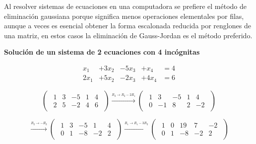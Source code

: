 \documentclass{article}
\begin{document}
Al resolver sistemas de ecuaciones en una computadora se prefiere el método de eliminación gaussiana porque significa menos operaciones elementales por filas, aunque a veces es esencial obtener la forma escalonada reducida por renglones de una matriz, en estos casos la eliminación de Gauss-Jordan es el método preferido.

\begin{large}
    \textbf{Solución de un sistema de 2 ecuaciones con 4 incógnitas}
\end{large}

\begin{equation*}
    \begin{aligned}
    x_1 &+ 3x_2 &- 5x_3 &+ x_4 &= 4 \\
    2x_1 &+ 5x_2 &- 2x_3 &+ 4x_4 &= 6    
    \end{aligned}
\end{equation*}

\begin{equation*}
    \begin{pmatrix}
        \begin{array}{rrrr|r}
            1 & 3 & -5 & 1 & 4\\
            2 & 5 & -2 & 4 & 6
        \end{array}
    \end{pmatrix}
\xrightarrow{\stackrel{R_2 \rightarrow R_2 - 2R_1}{}}
    \begin{pmatrix}
        \begin{array}{rrrr|r}
            1 & 3 & -5 & 1 & 4\\
            0 & -1 & 8 & 2 & -2
        \end{array}
    \end{pmatrix}
\end{equation*}

\begin{equation*}
    \xrightarrow{\stackrel{R_2 \rightarrow -R_2}{}}
    \begin{pmatrix}
        \begin{array}{rrrr|r}
            1 & 3 & -5 & 1 & 4\\
            0 & 1 & -8 & -2 & 2
        \end{array}
    \end{pmatrix}
\xrightarrow{\stackrel{R_1 \rightarrow R_1 - 3R_2}{}}
    \begin{pmatrix}
        \begin{array}{rrrr|r}
            1 & 0 & 19 & 7 & -2\\
            0 & 1 & -8 & -2 & 2
        \end{array}
    \end{pmatrix}
\end{equation*}
\end{document}
